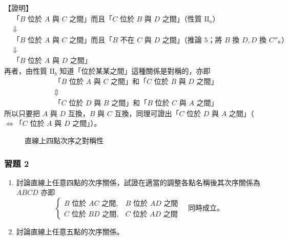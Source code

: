 \noindent【證明】\quad
\begin{align*}
  &\text{「$B$ 位於 $A$ 與 $C$ 之間」而且「$C$ 位於 $B$ 與 $D$ 之間」（性質 $\mathrm{II}_a$）} \\
  &\Downarrow \\
  &\text{「$B$ 位於 $A$ 與 $C$ 之間」而且「$B$ 不在 $C$ 與 $D$ 之間」（推論 5；將 $B$ 換 $D, D$ 換 $C''$。）} \\
  &\Downarrow \\
  &\text{「$B$ 位於 $A$ 與 $D$ 之間」}
\end{align*}
再者，由性質 $\mathrm{II}_b$ 知道「位於某某之間」這種關係是對稱的，亦即
\begin{align*}
  &\text{「$B$ 位於 $A$ 與 $C$ 之間」和「$C$ 位於 $B$ 與 $D$ 之間」} \\
  &\Updownarrow \\
  &\text{「$C$ 位於 $D$ 與 $B$ 之間」和「$B$ 位於 $C$ 與 $A$ 之間」}
\end{align*}
所以只要把 $A$ 與 $D$ 互換，$B$ 與 $C$ 互換，同理可證出「$C$ 位於 $D$ 與 $A$ 之間」（$\Longleftrightarrow$「$C$ 位於 $A$ 與 $D$ 之間」）。

\begin{figure}[H]
\centering
{}
\caption{直線上四點次序之對稱性}
\label{fig:b3-a1-11}
\end{figure}

\subsubsection*{習題 2}
\begin{enumerate}[1., leftmargin=2em]
  \item 討論直線上任意四點的次序關係，試證在適當的調整各點名稱後其次序關係為 $ABCD$ 亦即
  \[
  \begin{cases}
    B \text{ 位於 } AC \text{ 之間}, & B \text{ 位於 } AD \text{ 之間} \\
    C \text{ 位於 } BD \text{ 之間}, & C \text{ 位於 } AD \text{ 之間}
  \end{cases}
  \quad \text{同時成立。}
  \]
  \item 討論直線上任意五點的次序關係。
\end{enumerate}

